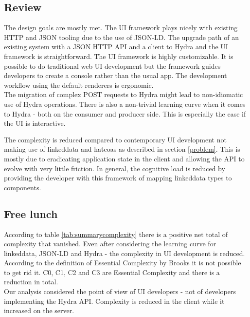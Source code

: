 \subsection{Review}
The design goals are mostly met. The UI framework plays nicely with existing HTTP and JSON tooling due to the use of JSON-LD. The upgrade path of an existing system with a JSON HTTP API and a client to Hydra and the UI framework is straightforward. The UI framework is highly customizable. It is possible to do traditional web UI development but the framework guides developers to create a \gls{console} rather than the usual app. The development workflow using the default renderers is ergonomic. \\
The migration of complex POST requests to Hydra might lead to non-idiomatic use of Hydra operations. There is also a non-trivial learning curve when it comes to Hydra - both on the consumer and producer side. This is especially the case if the UI is interactive.

The complexity is reduced compared to contemporary UI development not making use of \gls{linkeddata} and \gls{hateoas} as described in section \ref{problem}. This is mostly due to eradicating application state in the client and allowing the API to evolve with very little friction. In general, the \gls{cognitive load} is reduced by providing the developer with this framework of mapping \gls{linkeddata} types to components.

\subsection{Free lunch}
According to table \ref{tab:summarycomplexity} there is a positive net total of complexity that vanished. Even after considering the learning curve for \gls{linkeddata}, JSON-LD and Hydra - the complexity in UI development is reduced. \\
According to the definition of Essential Complexity by Brooks it is not possible to get rid it. C0, C1, C2 and C3 are Essential Complexity and there is a reduction in total. \\
Our analysis considered the point of view of UI developers - not of developers implementing the Hydra API. Complexity is reduced in the client while it increased on the server.

